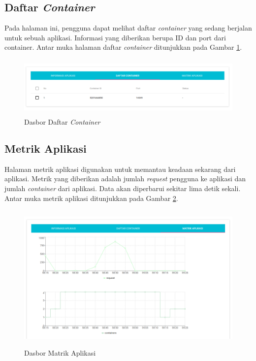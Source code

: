          \subsection{Daftar \textit{Container}}
         	Pada halaman ini, pengguna dapat melihat daftar \textit{container} yang sedang berjalan untuk sebuah aplikasi. Informasi yang diberikan berupa ID dan port dari container. Antar muka halaman daftar \textit{container} ditunjukkan pada Gambar \ref{ddaftarcontainer}.
            \begin{figure}[H]
				\centering
				\includegraphics[width=11.2cm,height=3cm]{Images/C-4/dasdafcont.PNG}
				\caption{Dasbor Daftar \textit{Container}}
				\label{ddaftarcontainer}
			\end{figure}
            
         \subsection{Metrik Aplikasi}
         	Halaman metrik aplikasi digunakan untuk memantau keadaan sekarang dari aplikasi. Metrik yang diberikan adalah jumlah \textit{request} pengguna ke aplikasi dan jumlah \textit{container} dari aplikasi. Data akan diperbarui sekitar lima detik sekali. Antar muka metrik aplikasi ditunjukkan pada Gambar \ref{dmatrikaplikasi}.
            \begin{figure}[H]
				\centering
				\includegraphics[width=11.2cm,height=7.3cm]{Images/C-4/dasmatrik.PNG}
				\caption{Dasbor Matrik Aplikasi}
				\label{dmatrikaplikasi}
			\end{figure}